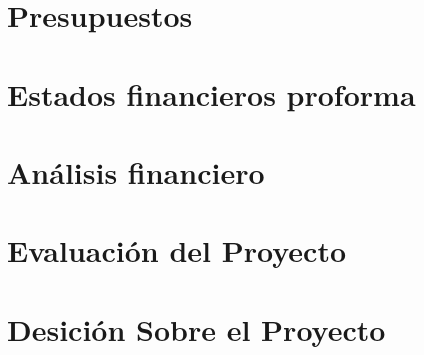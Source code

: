 \section{Presupuestos}


\section{Estados financieros proforma}


\section{Análisis financiero}

\section{Evaluación del Proyecto}


\section{Desición Sobre el Proyecto}